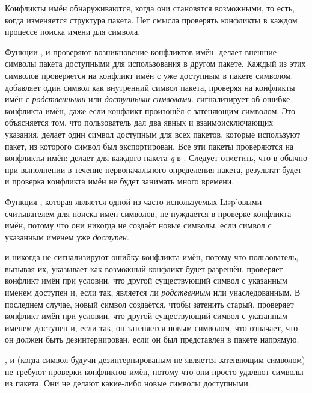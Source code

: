 Конфликты имён обнаруживаются, когда они становятся возможными, то есть, когда
изменяется структура пакета. Нет смысла проверять конфликты в каждом процессе
поиска имени для символа.

Функции ,  и  проверяют возникновение
конфликтов имён.  делает внешние символы пакета доступными для
использования в другом пакете. Каждый из этих символов проверяется на конфликт
имён с уже доступным в пакете символом.
 добавляет один символ как внутренний символ пакета, проверяя на
конфликты имён с \emph{родственными} или \emph{доступными
  символами}.  сигнализирует об ошибке конфликта имён, даже если
конфликт произошёл с затеняющим символом. Это объясняется том, что пользователь
дал два явных и взаимоисключающих указания.
 делает один символ доступным для всех пакетов, которые используют
пакет, из которого символ был экспортирован. Все эти пакеты проверяются на
конфликты имён:  делает  для каждого пакета \emph{q} в
. Следует отметить, что в обычно при
выполнении  в течение первоначального определения пакета, результат
 будет {\false} и проверка конфликта имён не будет
занимать много времени.

Функция , которая является одной из часто используемых Lisp'овыми считывателем
для поиска имен символов, не нуждается в проверке конфликта имён, потому что они
никогда не создаёт новые символы, если символ с указанным именем уже \emph{доступен}.

 и  никогда не сигнализируют ошибку конфликта
имён, потому что пользователь, вызывая их, указывает как возможный конфликт
будет разрешён.  проверяет конфликт имён при условии, что другой
существующий символ с указанным именем доступен и, если так, является ли
\emph{родственным} или унаследованным. В последнем случае, новый символ
создаётся, чтобы затенить старый.   проверяет конфликт
имён при условии, что другой существующий символ с указанным именем доступен и,
если так, он затеняется новым символом, что означает, что он должен быть
дезинтернирован, если он был представлен в пакете напрямую.

,  и  (когда символ будучи
дезинтернированым не является затеняющим символом) не требуют проверки
конфликтов имён, потому что они просто удаляют символы из пакета. Они не делают
какие-либо новые символы доступными.

